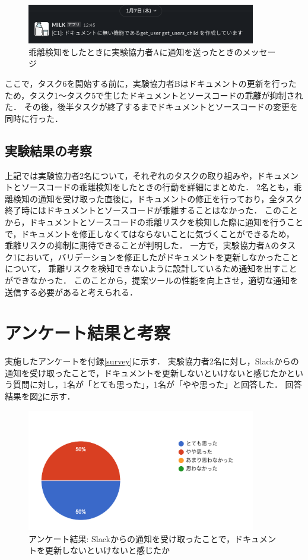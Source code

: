 \begin{figure}[H]
    \centering
    \includegraphics[width=10cm]{images/notification2.png}
    \caption{乖離検知をしたときに実験協力者Aに通知を送ったときのメッセージ}
    \label{notification2}
\end{figure}

ここで，タスク6を開始する前に，実験協力者Bはドキュメントの更新を行ったため，タスク1〜タスク5で生じたドキュメントとソースコードの乖離が抑制された．
その後，後半タスクが終了するまでドキュメントとソースコードの変更を同時に行った．

\subsection{実験結果の考察}
上記では実験協力者2名について，それぞれのタスクの取り組みや，ドキュメントとソースコードの乖離検知をしたときの行動を詳細にまとめた．
2名とも，乖離検知の通知を受け取った直後に，ドキュメントの修正を行っており，全タスク終了時にはドキュメントとソースコードが乖離することはなかった．
このことから，ドキュメントとソースコードの乖離リスクを検知した際に通知を行うことで，ドキュメントを修正しなくてはならないことに気づくことができるため，
乖離リスクの抑制に期待できることが判明した．
一方で，実験協力者Aのタスク1において，バリデーションを修正したがドキュメントを更新しなかったことについて，
乖離リスクを検知できないように設計しているため通知を出すことができなかった．
このことから，提案ツールの性能を向上させ，適切な通知を送信する必要があると考えられる．

\section{アンケート結果と考察}
実施したアンケートを付録\ref{survey}に示す．
実験協力者2名に対し，Slackからの通知を受け取ったことで，ドキュメントを更新しないといけないと感じたかという質問に対し，1名が「とても思った」，1名が「やや思った」と回答した．
回答結果を図\ref{q1}に示す．
\begin{figure}[H]
    \centering
    \includegraphics[width=10cm]{images/q1.png}
    \caption{アンケート結果: Slackからの通知を受け取ったことで，ドキュメントを更新しないといけないと感じたか}
    \label{q1}
\end{figure}

